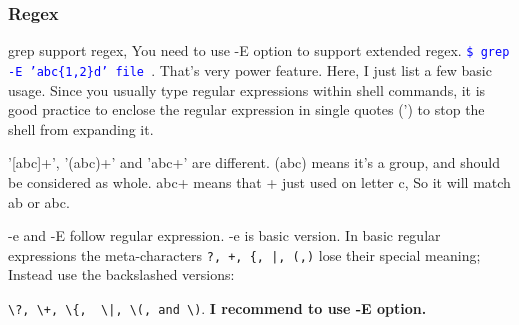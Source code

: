 \documentclass[paper=8.5in:11in, twoside, 12pt, pagesize=pdftex]{book}
\newcommand{\linuxcommand}[1]{\texttt{\textcolor{blue}{\$ #1 \Pisymbol{psy}{191}}}}
\begin{document}
\subsubsection{Regex}
	grep support regex, You need to use -E option to support extended regex. \linuxcommand{grep -E 'abc\{1,2\}d' file}.  That's very power feature. Here, I just list a few basic usage. Since you usually type regular expressions within shell commands, it is good practice to enclose the regular expression in single quotes (') to stop the shell from expanding it. 
	
	'[abc]+',  '(abc)+' and 'abc+' are different.  (abc) means it's a group, and should be considered as whole. abc+ means that + just used on letter c, So it will match ab or abc.  

	-e and -E follow regular expression. -e is basic version. In basic regular expressions the meta-characters \verb=?, +, {, |, (,)= lose their special meaning; Instead use the backslashed versions:
	
	\verb=\?, \+, \{,  \|, \(, and \)=. \textbf{I recommend to use -E option.}
	
%		
%		
	
\end{document}
